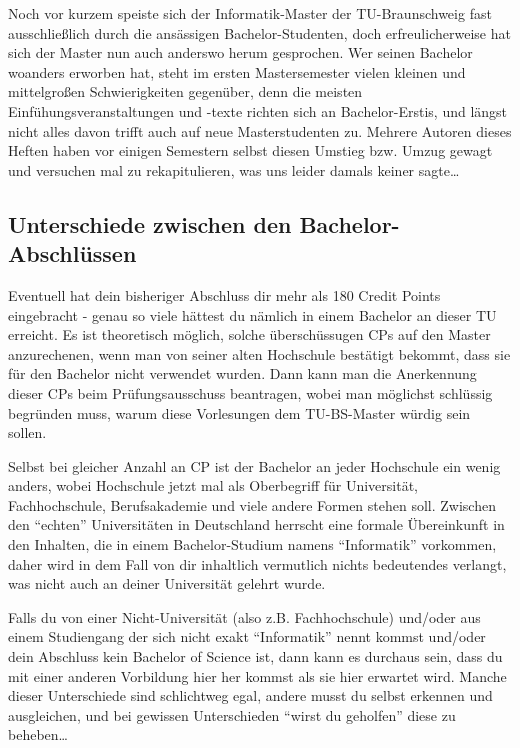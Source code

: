 \begin{multicols}{2}
\label{master}


Noch vor kurzem speiste sich der Informatik-Master der TU-Braunschweig fast ausschließlich durch die ansässigen Bachelor-Studenten, doch erfreulicherweise hat sich der Master nun auch anderswo herum gesprochen. Wer seinen Bachelor woanders erworben hat, steht im ersten Mastersemester vielen kleinen und mittelgroßen Schwierigkeiten gegenüber, denn die meisten Einfühungsveranstaltungen und -texte richten sich an Bachelor-Erstis, und längst nicht alles davon trifft auch auf neue Masterstudenten zu. Mehrere Autoren dieses Heften haben vor einigen Semestern selbst diesen Umstieg bzw. Umzug gewagt und versuchen mal zu rekapitulieren, was uns leider damals keiner sagte\ldots

\subsection{Unterschiede zwischen den Bachelor-Abschlüssen}
Eventuell hat dein bisheriger Abschluss dir mehr als 180 Credit Points eingebracht - genau so viele hättest du nämlich in einem Bachelor an dieser TU erreicht. Es ist theoretisch möglich, solche überschüssugen CPs auf den Master anzurechenen, wenn man von seiner alten Hochschule bestätigt bekommt, dass sie für den Bachelor nicht verwendet wurden. Dann kann man die Anerkennung dieser CPs beim Prüfungsausschuss beantragen, wobei man möglichst schlüssig begründen muss, warum diese Vorlesungen dem TU-BS-Master würdig sein sollen.

Selbst bei gleicher Anzahl an CP ist der Bachelor an jeder Hochschule ein wenig anders, wobei Hochschule jetzt mal als Oberbegriff für Universität, Fachhochschule, Berufsakademie und viele andere Formen stehen soll. Zwischen den "`echten"' Universitäten in Deutschland herrscht eine formale Übereinkunft in den Inhalten, die in einem Bachelor-Studium namens "`Informatik"' vorkommen, daher wird in dem Fall von dir inhaltlich vermutlich nichts bedeutendes verlangt, was nicht auch an deiner Universität gelehrt wurde.

Falls du von einer Nicht-Universität (also z.B. Fachhochschule) und/oder aus einem Studiengang der sich nicht exakt "`Informatik"' nennt kommst und/oder dein Abschluss kein Bachelor of Science ist, dann kann es durchaus sein, dass du mit einer anderen Vorbildung hier her kommst als sie hier erwartet wird. Manche dieser Unterschiede sind schlichtweg egal, andere musst du selbst erkennen und ausgleichen, und bei gewissen Unterschieden "`wirst du geholfen"' diese zu beheben\ldots


\end{multicols}
